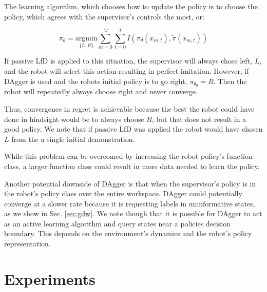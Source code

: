 \documentclass[10pt, conference]{ieeeconf}      %
\begin{document}
The learning algorithm, which chooses how to update the policy is to choose the policy, which agrees with the supervisor's controls the most, or: 

$$\pi_{\theta} = \underset{\lbrace L,R \rbrace}{\mbox{argmin}} \sum^M_{m=0}\sum^T_{t=0} I(\pi_\theta(x_{m,t}),\tilde{\pi}(x_{m,t}))$$

If passive LfD is applied to this situation, the supervisor will always chose left, $L$, and the robot will select this action resulting in perfect imitation. However, if DAgger is used and the robots initial policy is to go right, $\pi_{\theta_0} = R$. Then the robot will repeatedly always choose right and never converge. 

Thus, convergence in regret is achievable because the best the robot could have done in hindsight would be to always choose $R$, but that does not result in a good policy. We note that if passive LfD was applied the robot would have chosen $L$ from the a single initial demonstration. 

 While this problem can be overcomed by increasing the robot policy's function class, a larger function class could result in more data needed to learn the policy\cite{kakade2009generalization}.
 
Another potential downside of DAgger is that when the supervisor's policy is in the robot's policy class over the entire workspace. DAgger could potentially converge at a slower rate because it is requesting labels in uninformative states, as we show in Sec. \ref{sec:gdw}. We note though that it is possible for DAgger to act as an active learning algorithm and query states near a policies decision boundary. This depends on the environment's dynamics and the robot's policy representation. 





\section{Experiments}
\end{document}
